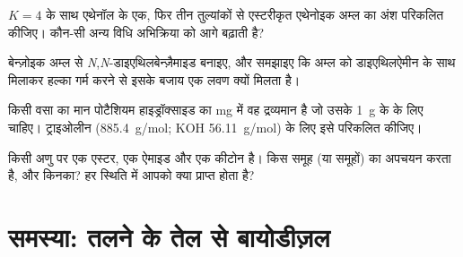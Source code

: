 \begin{exercise}[$\star\star$]\label{exo:b2:acyl-substitution:9}
$K = 4$ के साथ एथेनॉल के एक, फिर तीन तुल्यांकों से एस्टरीकृत एथेनोइक अम्ल का अंश परिकलित
कीजिए। कौन-सी अन्य विधि अभिक्रिया को आगे बढ़ाती है?
\end{exercise}

\begin{exercise}[$\star\star\star$]\label{exo:b2:acyl-substitution:10}
बेन्ज़ोइक अम्ल से \textit{N},\textit{N}-डाइएथिलबेन्ज़ैमाइड बनाइए, और समझाइए कि अम्ल को
डाइएथिलऐमीन के साथ मिलाकर हल्का गर्म करने से इसके बजाय एक लवण क्यों मिलता है।
\end{exercise}

\begin{exercise}[$\star\star\star$]\label{exo:b2:acyl-substitution:11}
किसी वसा का  मान पोटैशियम हाइड्रॉक्साइड का mg में वह द्रव्यमान है जो उसके \qty{1}{g} के
 के लिए चाहिए। ट्राइओलीन (\qty{885.4}{g/mol}; KOH \qty{56.11}{g/mol}) के लिए इसे परिकलित कीजिए।
\end{exercise}

\begin{exercise}[$\star\star\star$]\label{exo:b2:acyl-substitution:12}
किसी अणु पर एक एस्टर, एक ऐमाइड और एक कीटोन है।  किस समूह (या समूहों) का अपचयन करता है, और
 किनका? हर स्थिति में आपको क्या प्राप्त होता है?
\end{exercise}

\section{समस्या: तलने के तेल से बायोडीज़ल}

